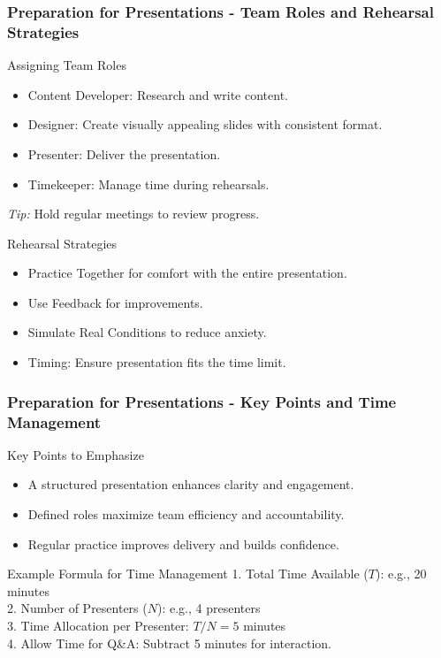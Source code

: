\documentclass[aspectratio=169]{beamer}
\begin{document}
\begin{frame}[fragile]
    \frametitle{Preparation for Presentations - Team Roles and Rehearsal Strategies}
    \begin{block}{Assigning Team Roles}
        \begin{itemize}
            \item Content Developer: Research and write content.
            \item Designer: Create visually appealing slides with consistent format.
            \item Presenter: Deliver the presentation.
            \item Timekeeper: Manage time during rehearsals.
        \end{itemize}
        \textit{Tip:} Hold regular meetings to review progress.
    \end{block}
    
    \vspace{1em}
    
    \begin{block}{Rehearsal Strategies}
        \begin{itemize}
            \item Practice Together for comfort with the entire presentation.
            \item Use Feedback for improvements.
            \item Simulate Real Conditions to reduce anxiety.
            \item Timing: Ensure presentation fits the time limit.
        \end{itemize}
    \end{block}
\end{frame}

\begin{frame}[fragile]
    \frametitle{Preparation for Presentations - Key Points and Time Management}
    \begin{block}{Key Points to Emphasize}
        \begin{itemize}
            \item A structured presentation enhances clarity and engagement.
            \item Defined roles maximize team efficiency and accountability.
            \item Regular practice improves delivery and builds confidence.
        \end{itemize}
    \end{block}
    
    \vspace{1em}
    
    \begin{block}{Example Formula for Time Management}
        1. Total Time Available ($T$): e.g., 20 minutes \\
        2. Number of Presenters ($N$): e.g., 4 presenters \\
        3. Time Allocation per Presenter: $T / N = 5$ minutes \\
        4. Allow Time for Q\&A: Subtract 5 minutes for interaction.
    \end{block}
\end{frame}
\end{document}
